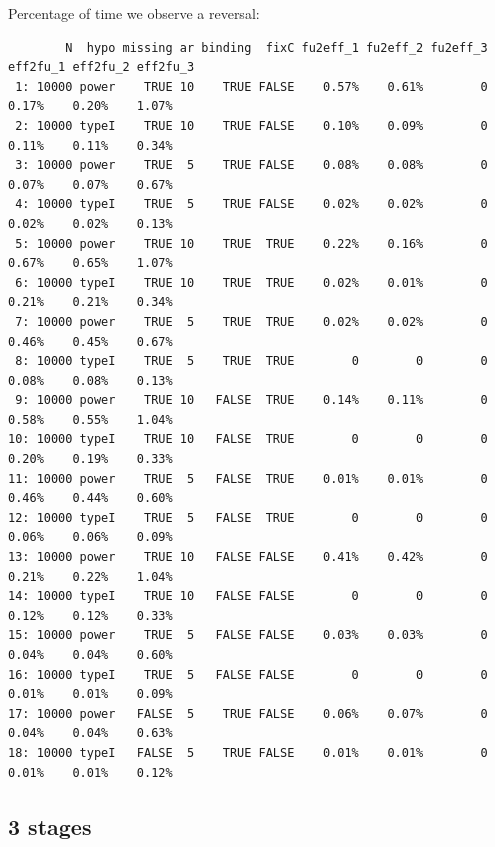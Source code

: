 \documentclass[12pt]{article}
\begin{document}
Percentage of time we observe a reversal:
\begin{verbatim}
        N  hypo missing ar binding  fixC fu2eff_1 fu2eff_2 fu2eff_3 eff2fu_1 eff2fu_2 eff2fu_3
 1: 10000 power    TRUE 10    TRUE FALSE    0.57%    0.61%        0    0.17%    0.20%    1.07%
 2: 10000 typeI    TRUE 10    TRUE FALSE    0.10%    0.09%        0    0.11%    0.11%    0.34%
 3: 10000 power    TRUE  5    TRUE FALSE    0.08%    0.08%        0    0.07%    0.07%    0.67%
 4: 10000 typeI    TRUE  5    TRUE FALSE    0.02%    0.02%        0    0.02%    0.02%    0.13%
 5: 10000 power    TRUE 10    TRUE  TRUE    0.22%    0.16%        0    0.67%    0.65%    1.07%
 6: 10000 typeI    TRUE 10    TRUE  TRUE    0.02%    0.01%        0    0.21%    0.21%    0.34%
 7: 10000 power    TRUE  5    TRUE  TRUE    0.02%    0.02%        0    0.46%    0.45%    0.67%
 8: 10000 typeI    TRUE  5    TRUE  TRUE        0        0        0    0.08%    0.08%    0.13%
 9: 10000 power    TRUE 10   FALSE  TRUE    0.14%    0.11%        0    0.58%    0.55%    1.04%
10: 10000 typeI    TRUE 10   FALSE  TRUE        0        0        0    0.20%    0.19%    0.33%
11: 10000 power    TRUE  5   FALSE  TRUE    0.01%    0.01%        0    0.46%    0.44%    0.60%
12: 10000 typeI    TRUE  5   FALSE  TRUE        0        0        0    0.06%    0.06%    0.09%
13: 10000 power    TRUE 10   FALSE FALSE    0.41%    0.42%        0    0.21%    0.22%    1.04%
14: 10000 typeI    TRUE 10   FALSE FALSE        0        0        0    0.12%    0.12%    0.33%
15: 10000 power    TRUE  5   FALSE FALSE    0.03%    0.03%        0    0.04%    0.04%    0.60%
16: 10000 typeI    TRUE  5   FALSE FALSE        0        0        0    0.01%    0.01%    0.09%
17: 10000 power   FALSE  5    TRUE FALSE    0.06%    0.07%        0    0.04%    0.04%    0.63%
18: 10000 typeI   FALSE  5    TRUE FALSE    0.01%    0.01%        0    0.01%    0.01%    0.12%
\end{verbatim}

\clearpage

\subsection{3 stages}
\label{sec:org4a17e99}
\end{document}
